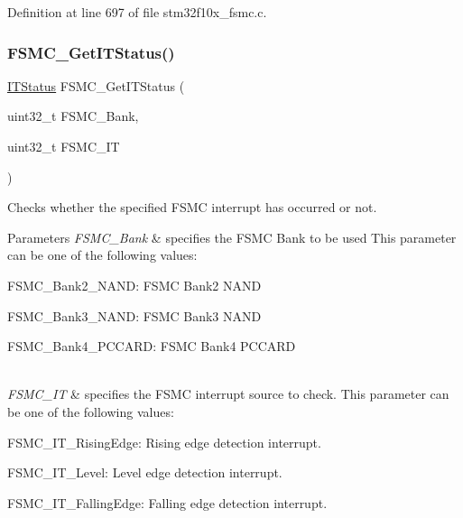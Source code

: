 Definition at line 697 of file stm32f10x\+\_\+fsmc.\+c.

\mbox{\label{group___f_s_m_c___exported___functions_ga7fce9ca889d33cd8b8b7413875dd4d73}} 
\subsubsection{\texorpdfstring{F\+S\+M\+C\+\_\+\+Get\+I\+T\+Status()}{FSMC\_GetITStatus()}}
{\footnotesize\ttfamily \hyperlink{group___exported__types_gaacbd7ed539db0aacd973a0f6eca34074}{I\+T\+Status} F\+S\+M\+C\+\_\+\+Get\+I\+T\+Status (\begin{DoxyParamCaption}\item[{uint32\+\_\+t}]{F\+S\+M\+C\+\_\+\+Bank,  }\item[{uint32\+\_\+t}]{F\+S\+M\+C\+\_\+\+IT }\end{DoxyParamCaption})}



Checks whether the specified F\+S\+MC interrupt has occurred or not. 


\begin{DoxyParams}{Parameters}
{\em F\+S\+M\+C\+\_\+\+Bank} & specifies the F\+S\+MC Bank to be used This parameter can be one of the following values\+: \begin{DoxyItemize}
\item F\+S\+M\+C\+\_\+\+Bank2\+\_\+\+N\+A\+ND\+: F\+S\+MC Bank2 N\+A\+ND \item F\+S\+M\+C\+\_\+\+Bank3\+\_\+\+N\+A\+ND\+: F\+S\+MC Bank3 N\+A\+ND \item F\+S\+M\+C\+\_\+\+Bank4\+\_\+\+P\+C\+C\+A\+RD\+: F\+S\+MC Bank4 P\+C\+C\+A\+RD \end{DoxyItemize}
\\
\hline
{\em F\+S\+M\+C\+\_\+\+IT} & specifies the F\+S\+MC interrupt source to check. This parameter can be one of the following values\+: \begin{DoxyItemize}
\item F\+S\+M\+C\+\_\+\+I\+T\+\_\+\+Rising\+Edge\+: Rising edge detection interrupt. \item F\+S\+M\+C\+\_\+\+I\+T\+\_\+\+Level\+: Level edge detection interrupt. \item F\+S\+M\+C\+\_\+\+I\+T\+\_\+\+Falling\+Edge\+: Falling edge detection interrupt. \end{DoxyItemize}
\\
\hline
\end{DoxyParams}

